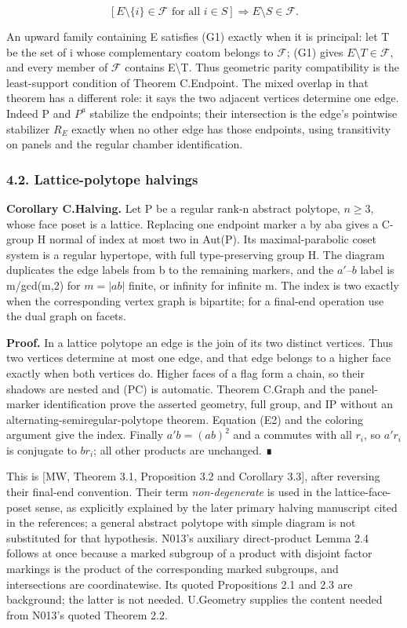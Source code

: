 \documentclass[
  11pt,
  a4paper,
]{article}
\begin{document}
\[
[E\setminus\{i\}\in\mathcal F\text{ for all }i\in S]
\Longrightarrow E\setminus S\in\mathcal F.
\tag{G1}
\]

An upward family containing E satisfies (G1) exactly when it is
principal: let T be the set of i whose complementary coatom belongs to
\(\mathcal F\); (G1) gives \(E\setminus T\in \mathcal F\), and every
member of \(\mathcal F\) contains E\textbackslash T. Thus geometric
parity compatibility is the least-support condition of Theorem
C.Endpoint. The mixed overlap in that theorem has a different role: it
says the two adjacent vertices determine one edge. Indeed P and \(P^a\)
stabilize the endpoints; their intersection is the edge's pointwise
stabilizer \(R_E\) exactly when no other edge has those endpoints, using
transitivity on panels and the regular chamber identification.

\subsubsection{4.2. Lattice-polytope
halvings}\label{lattice-polytope-halvings}

\textbf{Corollary C.Halving.} Let P be a regular rank-n abstract
polytope, \(n\ge 3\), whose face poset is a lattice. Replacing one
endpoint marker a by aba gives a C-group H normal of index at most two
in Aut(P). Its maximal-parabolic coset system is a regular hypertope,
with full type-preserving group H. The diagram duplicates the edge
labels from b to the remaining markers, and the \(a'–b\) label is
m/gcd(m,2) for \(m=|ab|\) finite, or infinity for infinite m. The index
is two exactly when the corresponding vertex graph is bipartite; for a
final-end operation use the dual graph on facets.

\textbf{Proof.} In a lattice polytope an edge is the join of its two
distinct vertices. Thus two vertices determine at most one edge, and
that edge belongs to a higher face exactly when both vertices do. Higher
faces of a flag form a chain, so their shadows are nested and (PC) is
automatic. Theorem C.Graph and the panel-marker identification prove the
asserted geometry, full group, and IP without an
alternating-semiregular-polytope theorem. Equation (E2) and the coloring
argument give the index. Finally \(a'b=(ab)^{2}\) and a commutes with
all \(r_i\), so \(a'r_i\) is conjugate to \(br_i\); all other products
are unchanged. ∎

This is {[}MW, Theorem 3.1, Proposition 3.2 and Corollary 3.3{]}, after
reversing their final-end convention. Their term \emph{non-degenerate}
is used in the lattice-face-poset sense, as explicitly explained by the
later primary halving manuscript cited in the references; a general
abstract polytope with simple diagram is not substituted for that
hypothesis. N013's auxiliary direct-product Lemma 2.4 follows at once
because a marked subgroup of a product with disjoint factor markings is
the product of the corresponding marked subgroups, and intersections are
coordinatewise. Its quoted Propositions 2.1 and 2.3 are background; the
latter is not needed. U.Geometry supplies the content needed from N013's
quoted Theorem 2.2.
\end{document}

